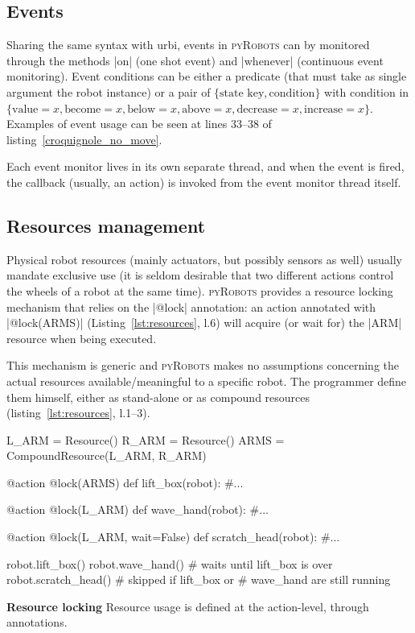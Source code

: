 \documentclass[a4paper, 10pt, conference]{ieeeconf}      %
\newcommand{\pyRobots}{\textsc{pyRobots}}
\begin{document}
\subsection{Events}

Sharing the same syntax with {\sc urbi}, events in \pyRobots{} can by monitored
through the methods \python|on| (one shot event) and \python|whenever|
(continuous event monitoring). Event conditions can be either a predicate (that
must take as single argument the robot instance) or a pair of $\{\text{state
key}, \text{condition}\}$ with condition in $\{\text{value}=x, \text{become}=x,
\text{below}=x, \text{above}=x, \text{decrease}=x, \text{increase}=x\}$.
Examples of event usage can be seen at lines 33--38 of
listing~\ref{croquignole_no_move}.

Each event monitor lives in its own separate thread, and when the event is fired,
the callback (usually, an action) is invoked from the event monitor thread
itself.

\subsection{Resources management}

Physical robot resources (mainly actuators, but possibly sensors as
well) usually mandate exclusive use (it is seldom desirable that two different actions
control the wheels of a robot at the same time). \pyRobots{} provides a resource
locking mechanism that relies on the \python|@lock| annotation: an action
annotated with \python|@lock(ARMS)| (Listing~\ref{lst:resources}, l.6) will
acquire (or wait for) the \python|ARM| resource when being executed.

This mechanism is generic and \pyRobots{} makes no assumptions concerning the
actual resources available/meaningful to a specific robot. The
programmer define them himself, either as stand-alone or as compound
resources (listing~\ref{lst:resources}, l.1--3).

\begin{listing}[H]
\begin{pythoncode}
    L_ARM = Resource()
    R_ARM = Resource()
    ARMS = CompoundResource(L_ARM, R_ARM)

    @action
    @lock(ARMS)
    def lift_box(robot):
        #...

    @action
    @lock(L_ARM)
    def wave_hand(robot):
        #...

    @action
    @lock(L_ARM, wait=False)
    def scratch_head(robot):
        #...

    robot.lift_box()
    robot.wave_hand() # waits until lift_box is over
    robot.scratch_head() # skipped if lift_box or
                         # wave_hand are still running

\end{pythoncode}
\caption{\textbf{Resource locking} Resource usage is defined at the
action-level, through annotations.}

\label{lst:resources}
\end{listing}
\end{document}
